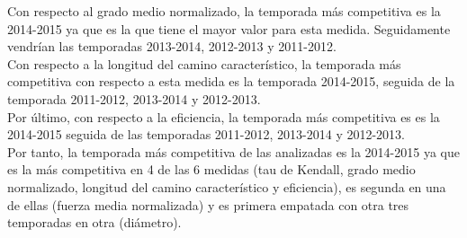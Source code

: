 Con respecto al grado medio normalizado, la temporada más competitiva es la 2014-2015 ya que es la que tiene el mayor valor para esta medida. Seguidamente vendrían las temporadas 2013-2014, 2012-2013 y 2011-2012.\\

Con respecto a la longitud del camino característico, la temporada más competitiva con respecto a esta medida es la temporada 2014-2015, seguida de la temporada 2011-2012, 2013-2014 y 2012-2013.\\

Por último, con respecto a la eficiencia, la temporada más competitiva es es la 2014-2015 seguida de las temporadas 2011-2012, 2013-2014 y 2012-2013.\\

Por tanto, la temporada más competitiva de las analizadas es la 2014-2015 ya que es la más competitiva en 4 de las 6 medidas (tau de Kendall, grado medio normalizado, longitud del camino característico y eficiencia), es segunda en una de ellas (fuerza media normalizada) y es primera empatada con otra tres temporadas en otra (diámetro). 
